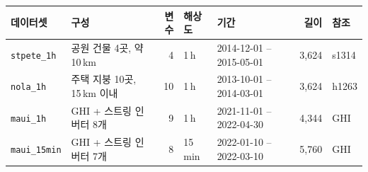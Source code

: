 \begin{tabular}{llrllrl}
\toprule
데이터셋 & 구성 & 변수 & 해상도 & 기간 & 길이 & 참조 \\
\midrule
\texttt{stpete\_1h} & 공원 건물 4곳, 약 10\,km & 4 & 1\,h & 2014-12-01 -- 2015-05-01 & 3,624 & s1314 \\
\texttt{nola\_1h} & 주택 지붕 10곳, 15\,km 이내 & 10 & 1\,h & 2013-10-01 -- 2014-03-01 & 3,624 & h1263 \\
\texttt{maui\_1h} & GHI + 스트링 인버터 8개 & 9 & 1\,h & 2021-11-01 -- 2022-04-30 & 4,344 & GHI \\
\texttt{maui\_15min} & GHI + 스트링 인버터 7개 & 8 & 15\,min & 2022-01-10 -- 2022-03-10 & 5,760 & GHI \\
\bottomrule
\end{tabular}
